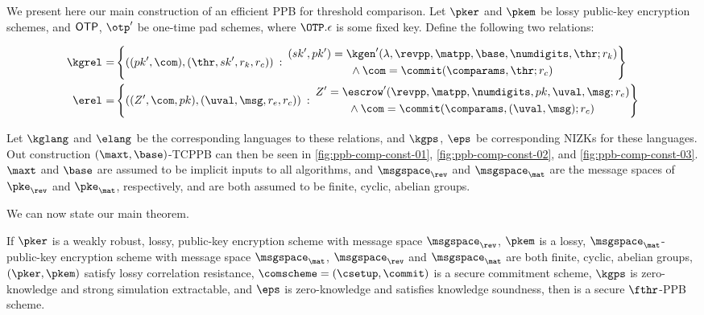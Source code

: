 We present here our main construction of an efficient PPB for threshold comparison.
Let $\pker$ and $\pkem$ be lossy public-key encryption schemes, and ${\sf OTP}$, $\otp'$ be one-time pad schemes, where $\OTP.\epsilon$ is some fixed key.
Define the following two relations:

\begin{align*}
	\kgrel^{} = & \left\{
	((pk', \com), (\thr, sk', r_k, r_c)) \::\:
	\begin{gathered}
		(sk', pk') = \kgen'(\lambda, \revpp, \matpp, \base, \numdigits, \thr; r_k) \\
		\wedge \: \com = \commit(\comparams, \thr; r_c)
	\end{gathered}
	\right\}              \\
	\erel^{} =  & \left\{
	((Z', \com, pk), (\uval, \msg, r_e, r_c)) \::\:
	\begin{gathered}
		Z' = \escrow'(\revpp, \matpp, \numdigits, pk, \uval, \msg; r_e) \\
		\wedge \: \com = \commit(\comparams, (\uval, \msg); r_c)
	\end{gathered}
	\right\}
\end{align*}

Let $\kglang^{}$ and $\elang^{}$ be the corresponding languages to these relations, and
$\kgps^{}$, $\eps^{}$ be corresponding NIZKs for these languages.
Out construction $(\maxt, \base)$-TCPPB can then be seen in \cref{fig:ppb-comp-const-01}, \cref{fig:ppb-comp-const-02}, and \cref{fig:ppb-comp-const-03}.
$\maxt$ and $\base$ are assumed to be implicit inputs to all algorithms, and $\msgspace_\rev$ and $\msgspace_\mat$ are the message spaces of $\pke_\rev$ and $\pke_\mat$, respectively, and are both assumed to be finite, cyclic, abelian groups.





We can now state our main theorem.

\begin{theorem}
	\label{thm:ppbs-main}
	If $\pker$ is a weakly robust, lossy, \wlap{} public-key encryption scheme with message space $\msgspace_\rev$, $\pkem$ is a lossy, $\msgspace_\mat$-\slap{} public-key encryption scheme with message space $\msgspace_\mat$, $\msgspace_\rev$ and $\msgspace_\mat$ are both finite, cyclic, abelian groups, $(\pker, \pkem)$ satisfy lossy correlation resistance, $\comscheme = (\csetup, \commit)$ is a secure commitment scheme, $\kgps$ is zero-knowledge and strong simulation extractable, and $\eps$ is zero-knowledge and satisfies knowledge soundness, then \schemename{} is a secure $\fthr$-PPB scheme.
\end{theorem}


